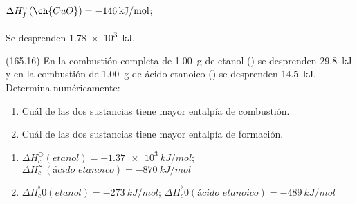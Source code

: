 \documentclass[10pt,a5paper,twoside]{article}
\begin{document}
  \begin{solution}
    \begin{enumerate*}
      \item \( \Delta H^0_f\,(\ch{CuO}) = \SI{-146}{kJ/mol} \);
      \item Se desprenden \SI{1.78e3}{kJ}.
    \end{enumerate*}
  \end{solution}




  \begin{exercise}[
      tags    = {},
      topics  = {química, termodinámica, termoquímica},
      source  = {FQ 1B MGH 2016, p165, e16},
    ]
    (165.16) En la combustión completa de \SI{1.00}{\gram} de etanol () se desprenden \SI{29.8}{kJ} y en la combustión de \SI{1.00}{\gram}
    de ácido etanoico () se desprenden \SI{14.5}{kJ}.
    Determina numéricamente:
    \begin{enumerate}
      \item Cuál de las dos sustancias tiene mayor entalpía de combustión.
      \item Cuál de las dos sustancias tiene mayor entalpía de formación.
    \end{enumerate}
  \end{exercise}

  \begin{solution}
    \begin{enumerate}
      \item \( \Delta H^○_c (\textit{etanol}) = \SI{-1.37e3}{kJ/mol} \); \newline
            \( \Delta H^\mdsmwhtcircle_c (\textit{ácido etanoico}) = \SI{-870}{kJ/mol} \) %
      \item \( \Delta H_c^^b0 (\textit{etanol}) = \SI{-273}{kJ/mol} \); \newline
            \( \Delta H_c^^b0 (\textit{ácido etanoico}) = \SI{-489}{kJ/mol} \) %
    \end{enumerate}
  \end{solution}
\end{document}

